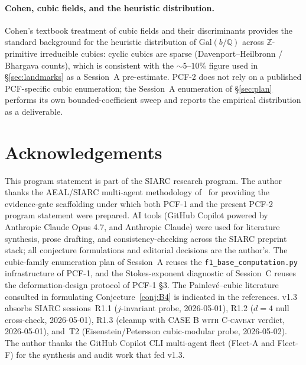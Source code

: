 \documentclass[11pt,a4paper]{article}
\theoremstyle{definition}
\theoremstyle{remark}
\newcommand{\Q}{\mathbb{Q}}
\newcommand{\Z}{\mathbb{Z}}
\newcommand{\Gal}{\mathrm{Gal}}
\begin{document}
\paragraph{Cohen, cubic fields, and the heuristic distribution.}
Cohen's textbook treatment of cubic fields and their discriminants
\cite{Cohen2007} provides the standard background for the heuristic
distribution of $\Gal(b/\Q)$ across $\Z$-primitive irreducible cubics:
cyclic cubics are sparse (Davenport--Heilbronn / Bhargava counts),
which is consistent with the $\sim 5$--$10\%$ figure used in
\S\ref{sec:landmarks} as a Session~A pre-estimate. PCF-2 does not
rely on a published PCF-specific cubic enumeration; the Session~A
enumeration of \S\ref{sec:plan} performs its own bounded-coefficient
sweep and reports the empirical distribution as a deliverable.

\section{Acknowledgements}\label{sec:ack}

This program statement is part of the SIARC research program. The author
thanks the AEAL/SIARC multi-agent methodology of~\cite{P8AEAL} for
providing the evidence-gate scaffolding under which both PCF-1 and the
present PCF-2 program statement were prepared. AI tools (GitHub Copilot
powered by Anthropic Claude Opus 4.7, and Anthropic Claude) were used
for literature synthesis, prose drafting, and consistency-checking
across the SIARC preprint stack; all conjecture formulations and editorial
decisions are the author's. The cubic-family enumeration plan of
Session~A reuses the \texttt{f1\_base\_computation.py} infrastructure of
PCF-1, and the Stokes-exponent diagnostic of Session~C reuses the
deformation-design protocol of PCF-1 \S 3. The Painlev\'e--cubic
literature consulted in formulating Conjecture~\ref{conj:B4} is
indicated in the references.
v1.3 absorbs SIARC sessions~R1.1 ($j$-invariant probe, 2026-05-01),
R1.2 ($d=4$ null cross-check, 2026-05-01), R1.3 (cleanup with
\textsc{CASE B with C-caveat} verdict, 2026-05-01), and~T2
(Eisenstein/Petersson cubic-modular probe, 2026-05-02). The author
thanks the GitHub Copilot CLI multi-agent fleet (Fleet-A and
Fleet-F) for the synthesis and audit work that fed v1.3.
\end{document}
